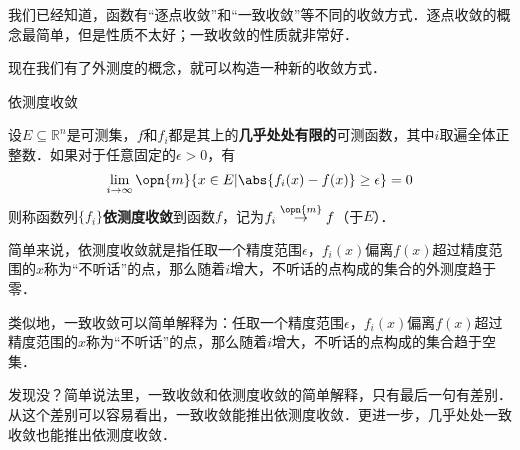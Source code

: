 

我们已经知道，函数有“逐点收敛”和“一致收敛”等不同的收敛方式．逐点收敛的概念最简单，但是性质不太好；一致收敛的性质就非常好．

现在我们有了外测度的概念，就可以构造一种新的收敛方式．

\begin{definition}{依测度收敛}

设$E\subseteq \mathbb{R}^n$是可测集，$f$和$f_i$都是其上的\textbf{几乎处处有限的}可测函数，其中$i$取遍全体正整数．如果对于任意固定的$\epsilon>0$，有
\begin{equation}
\lim\limits_{i\to\infty}\opn{m}\{x\in E|\abs{f_i(x)-f(x)}\geq\epsilon\}=0
\end{equation}
则称函数列$\{f_i\}$\textbf{依测度收敛}到函数$f$，记为$f_i\overset{\opn{m}}\to f$（于$E$）．

\end{definition}

简单来说，依测度收敛就是指任取一个精度范围$\epsilon$，$f_i(x)$偏离$f(x)$超过精度范围的$x$称为“不听话”的点，那么随着$i$增大，不听话的点构成的集合的外测度趋于零．

类似地，一致收敛可以简单解释为：任取一个精度范围$\epsilon$，$f_i(x)$偏离$f(x)$超过精度范围的$x$称为“不听话”的点，那么随着$i$增大，不听话的点构成的集合趋于空集．

发现没？简单说法里，一致收敛和依测度收敛的简单解释，只有最后一句有差别．从这个差别可以容易看出，一致收敛能推出依测度收敛．更进一步，几乎处处一致收敛也能推出依测度收敛．















